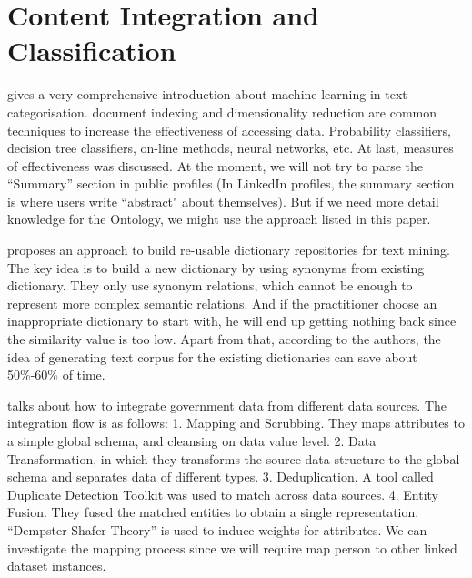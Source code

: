 
\section{Content Integration and Classification}

\cite{sebastiani2002} gives a very comprehensive introduction about machine learning in text categorisation. document indexing and dimensionality reduction are common techniques to increase the effectiveness of accessing data. Probability classifiers, decision tree classifiers, on-line methods, neural networks, etc. At last, measures of effectiveness was discussed. At the moment, we will not try to parse the ``Summary'' section in public profiles (In LinkedIn profiles, the summary section is where users write ``abstract" about themselves). But if we need more detail knowledge for the Ontology, we might use the approach listed in this paper.

\cite{godbole2010} proposes an approach to build re-usable dictionary repositories for text mining. The key idea is to build a new dictionary by using synonyms from existing dictionary. They only use synonym relations, which cannot be enough to represent more complex semantic relations. And if the practitioner choose an inappropriate dictionary to start with, he will end up getting nothing back since the similarity value is too low. Apart from that, according to the authors, the idea of generating text corpus for the existing dictionaries can save about 50\%-60\% of time.

\cite{bohm2010} talks about how to integrate government data from different data sources. The integration flow is as follows: 1. Mapping and Scrubbing. They maps attributes to a simple global schema, and cleansing on data value level. 2. Data Transformation, in which they transforms the source data structure to the global schema and separates data of different types. 3. Deduplication. A tool called Duplicate Detection Toolkit was used to match across data sources. 4. Entity Fusion. They fused the matched entities to obtain a single representation. ``Dempster-Shafer-Theory'' is used to induce weights for attributes. We can investigate the mapping process since we will require map person to other linked dataset instances.


